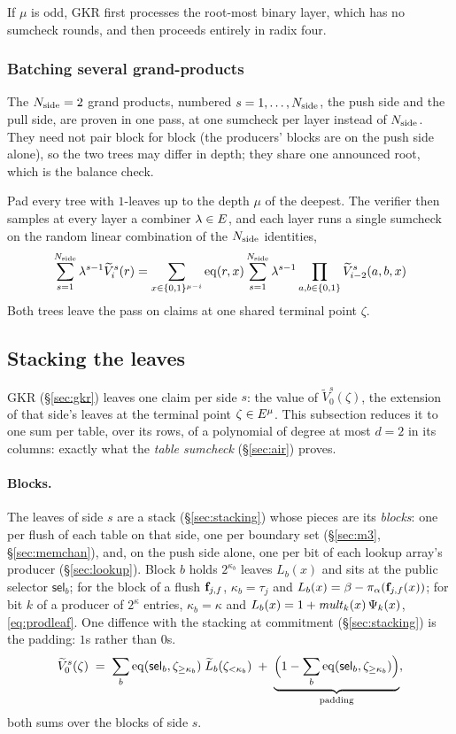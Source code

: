 If $\mu$ is odd, GKR first processes the root-most binary layer, which has no sumcheck rounds, and then proceeds entirely in radix four.

\subsubsection{Batching several grand-products}

The $N_{\mathrm{side}}=2$ grand products, numbered $s=1,\dots,N_{\mathrm{side}}$, the push side and the pull side, are proven in one pass, at one sumcheck per layer instead of $N_{\mathrm{side}}$. They need not pair block for block (the producers' blocks are on the push side alone), so the two trees may differ in depth; they share one announced root, which is the balance check.

Pad every tree with $1$-leaves up to the depth $\mu$ of the deepest. The verifier then samples at every layer a combiner $\lambda \in E$, and each layer runs a single sumcheck on the random linear combination of the $N_{\mathrm{side}}$ identities,
\[
\sum_{s=1}^{N_{\mathrm{side}}}\lambda^{s-1}\widetilde V_i^{s}(r)=\sum_{x\in\{0,1\}^{\mu-i}}\operatorname{eq}(r,x)\sum_{s=1}^{N_{\mathrm{side}}}\lambda^{s-1}\prod_{a,b\in\{0,1\}}\widetilde V_{i-2}^{s}(a,b,x)
\]
Both trees leave the pass on claims at one shared terminal point $\zeta$.

\subsection{Stacking the leaves}\label{sec:leafstack}

GKR (\S\ref{sec:gkr}) leaves one claim per side $s$: the value of $\widetilde V^{s}_0(\zeta)$, the extension of that side's leaves at the terminal point $\zeta\in E^{\mu}$. This subsection reduces it to one sum per table, over its rows, of a polynomial of degree at most $d=2$ in its columns: exactly what the \emph{table sumcheck} (\S\ref{sec:air}) proves.

\paragraph{Blocks.} The leaves of side $s$ are a stack (\S\ref{sec:stacking}) whose pieces are its \emph{blocks}: one per flush of each table on that side, one per boundary set (\S\ref{sec:m3}, \S\ref{sec:memchan}), and, on the push side alone, one per bit of each lookup array's producer (\S\ref{sec:lookup}). Block $b$ holds $2^{\kappa_b}$ leaves $L_b(x)$ and sits at the public selector $\mathsf{sel}_b$; for the block of a flush $\mathbf{f}_{j,f}$, $\kappa_b=\tau_j$ and $L_b(x)=\beta-\pi_\alpha(\mathbf{f}_{j,f}(x))$; for bit $k$ of a producer of $2^{\kappa}$ entries, $\kappa_b=\kappa$ and $L_b(x)=1+\mathit{mult}_{k}(x)\,\Psi_{k}(x)$, \eqref{eq:prodleaf}. One diffence with the stacking at commitment (\S\ref{sec:stacking}) is the padding: $1$s rather than $0$s.
\begin{equation}\label{eq:gkr_leaves}
  \widetilde V^{s}_0(\zeta)\;=\;\sum_{b}\operatorname{eq}(\mathsf{sel}_b,\zeta_{\ge\kappa_b})\;\widetilde L_b(\zeta_{<\kappa_b})\;+\;\underbrace{\Bigl(1-\sum_{b}\operatorname{eq}(\mathsf{sel}_b,\zeta_{\ge\kappa_b})\Bigr)}_{\text{padding}},
\end{equation}
both sums over the blocks of side $s$.

